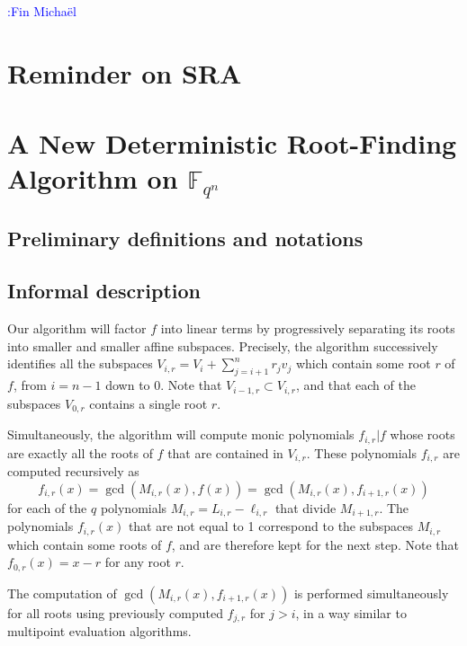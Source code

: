 \documentclass{sig-alternate}
\newcommand{\ff}[1]{\mathbb{F}_{#1}}
\newcommand{\qq}{q}
\newcommand{\nn}{n}
\newcommand{\qn}{{\qq^\nn}}
\newcommand{\extf}{\ff{\qn}}
\newcounter{algo}
\newcommand{\comf}{\noindent \textcolor{blue}{:Fin Micha\"el}}
\begin{document}






\comf






\section{Reminder on SRA}

\section{A New Deterministic Root-Finding Algorithm on $\extf$}

\subsection{Preliminary definitions and notations}

\subsection{Informal description}

Our algorithm will factor $f$ into linear terms by progressively separating its roots into smaller and smaller affine subspaces. 
%
Precisely, the algorithm successively identifies all the subspaces $V_{i,r}=V_{i}+\sum_{j=i+1}^nr_jv_j$ which contain some root $r$ of $f$, from $i=n-1$ down to 0. Note that $V_{i-1,r}\subset V_{i,r}$, and that each of the subspaces $V_{0,r}$ contains a single root $r$.

Simultaneously, the algorithm will compute monic polynomials $f_{i,r}|f$ whose roots are exactly all the roots of $f$ that are contained in $V_{i,r}$. 
%
These polynomials $f_{i,r}$ are computed recursively as
$$f_{i,r}(x)=\gcd(M_{i,r}(x),f(x))
=\gcd(M_{i,r}(x),f_{i+1,r}(x))$$
for each of the $q$ polynomials $M_{i,r}=L_{i,r}-\ell_{i,r}$ that divide $M_{i+1,r}$. The polynomials $f_{i,r}(x)$ that are not equal to 1 correspond to the subspaces $M_{i,r}$ which contain some roots of $f$, and are therefore kept for the next step.
%
Note that $f_{0,r}(x)=x-r$ for any root $r$.

The computation of $\gcd(M_{i,r}(x),f_{i+1,r}(x))$ is performed simultaneously for all roots using previously computed $f_{j,r}$ for $j>i$, in a way similar to multipoint evaluation algorithms.
\end{document}
